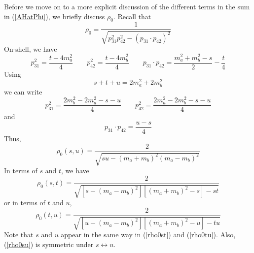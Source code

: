 Before we move on to a more explicit discussion of the different terms in the sum in (\ref{AHatPhi}), we briefly discuss $\rho_{0}$. Recall that
\begin{equation}
	\rho_{0} = \frac{1}{\sqrt{p_{31}^{2} p_{42}^{2} - (p_{31} \cdot p_{42})^{2}}}
\end{equation}
On-shell, we have
\begin{equation}
	p_{31}^{2} = \frac{t - 4 m_{a}^{2}}{4} \qquad p_{42}^{2} = \frac{t - 4 m_{b}^{2}}{4} \qquad p_{31} \cdot p_{42} = \frac{m_{a}^{2} + m_{b}^{2} - s}{2} - \frac{t}{4}
\end{equation}
Using
\begin{equation}
	s + t + u = 2m_{a}^{2} + 2m_{b}^{2}
\end{equation}
we can write
\begin{equation}
	p_{31}^{2} = \frac{2m_{b}^{2} - 2m_{a}^{2} - s - u}{4} \qquad p_{42}^{2} = \frac{2m_{a}^{2} - 2m_{b}^{2} - s - u}{4}
\end{equation}
and
\begin{equation}
	p_{31} \cdot p_{42} = \frac{u - s}{4}
\end{equation}
Thus,
\begin{equation}
	\rho_{0}(s, u) = \frac{2}{\sqrt{s u - (m_{a} + m_{b})^{2} (m_{a} - m_{b})^{2}}} \label{rho0su}
\end{equation}
In terms of $s$ and $t$, we have
\begin{equation}
	\rho_{0}(s, t) = \frac{2}{\sqrt{[s - (m_{a} - m_{b})^{2}] [(m_{a} + m_{b})^{2} - s] - s t}} \label{rho0st}
\end{equation}
or in terms of $t$ and $u$,
\begin{equation}
	\rho_{0}(t, u) = \frac{2}{\sqrt{[u - (m_{a} - m_{b})^{2}] [(m_{a} + m_{b})^{2} - u] - t u}} \label{rho0tu}
\end{equation}
Note that $s$ and $u$ appear in the same way in (\ref{rho0st}) and (\ref{rho0tu}). Also, (\ref{rho0su}) is symmetric under $s \longleftrightarrow u$.
